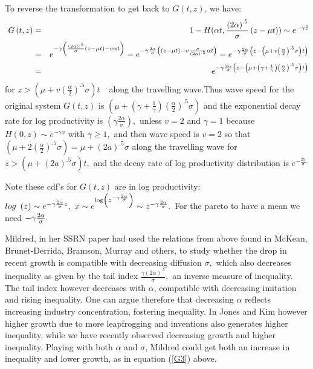 \documentclass[11pt]{article}
\theoremstyle{definition}
\begin{document}
To reverse the transformation to get back to $G\left( t,z\right) $, we have: 
\begin{eqnarray}
\ G\left( t,z\right)  &=&1-H(\alpha t,\frac{\left( 2\alpha \right) ^{.5}}{%
\sigma }\left( z-\mu t\right) )\sim e^{-\gamma \tilde{z}}  \label{G1} \\
&=&e^{-\gamma \left( \frac{\left( 2\alpha \right) ^{.5}}{\sigma }\left(
z-\mu t\right) -v\alpha t\right) }=e^{-\gamma \frac{2\alpha }{\sigma }\left(
\left( z-\mu t\right) -v\frac{\sigma }{\left( 2\alpha \right) ^{.5}}\alpha
t\right) }=e^{-\gamma \frac{2\alpha }{\sigma }\left( z-\left( \mu +v\left( 
\frac{\alpha }{2}\right) ^{.5}\sigma \right) t\right) }  \label{G2} \\
&=&e^{-\gamma \frac{2\alpha }{\sigma }\left( z-\left( \mu +\left( \gamma +%
\frac{1}{\gamma }\right) \left( \frac{\alpha }{2}\right) ^{.5}\sigma \right)
t\right) }  \label{G3}
\end{eqnarray}%
for $z>\left( \mu +v\left( \frac{\alpha }{2}\right) ^{.5}\sigma \right) t$ $%
\ $\ along the travelling wave.Thus wave speed  for the original system $%
G\left( t,z\right) $ is $\left( \mu +\left( \gamma +\frac{1}{\gamma }\right)
\left( \frac{\alpha }{2}\right) ^{.5}\sigma \right) $ and the exponential
decay rate for log productivity is $\left( \gamma \frac{2\alpha }{\sigma }%
\right) ,$  unless $v=2$ and $\gamma =1$ because $H\left( 0,z\right) \sim
e^{-\gamma x}$ with $\gamma \geq 1,$ and then wave speed is $v=2$ so that $%
\left( \mu +2\left( \frac{\alpha }{2}\right) ^{.5}\sigma \right) =\mu
+\left( 2a\right) ^{.5}\sigma $ along the travelling wave for $z>\left( \mu
+\left( 2a\right) ^{.5}\sigma \right) t,$ and the decay rate of log
productivity distribution is $e^{-\frac{2\alpha }{\sigma }.}$

Note these cdf's for $G\left( t,z\right) $ are in log productivity: $log\
\left( z\right) \sim e^{-\gamma \frac{2\alpha }{\sigma }z},\ x\sim e^{\log
\left( z^{-\gamma \frac{2\alpha }{\sigma }}\right) }\sim z^{-\gamma \frac{%
2\alpha }{\sigma }}.$ For the pareto to have a mean we need $-\gamma \frac{%
2\alpha }{\sigma }.$

Mildred, in her SSRN paper had used the relations from above found in
McKean, Brunet-Derrida, Bramson, Murray and others, to study whether the
drop in recent growth is compatible with decreasing diffusion $\sigma ,$
which also decreases inequality as given by the tail index  $\frac{\gamma
\left( 2\alpha \right) ^{.5}}{\sigma },$ an inverse measure of inequality.
The tail index  however decreases with $\alpha $, compatible with decreasing
imitation  and rising inequality. One can argue therefore that decreasing $%
\alpha $ reflects increasing industry concentration, fostering inequality.
In Jones and Kim however higher growth  due to more leapfrogging and
inventions also generates  higher inequality, while we have recently
observed decreasing growth and higher inequality. Playing with both $\alpha $
and $\sigma $, Mildred could get both an increase in inequality and lower
growth, as in equation (\ref{G3}) above.


%
\end{document}
